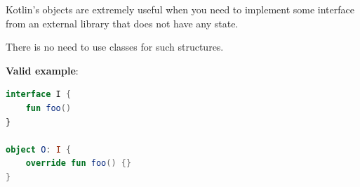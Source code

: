 {{{{Kotlin’s objects are extremely useful when you need to implement some interface from an external library that does not have any state.

There is no need to use classes for such structures.



\textbf{Valid example}:

\begin{lstlisting}[language=Kotlin]
interface I {
    fun foo()
}

object O: I {
    override fun foo() {}
}
\end{lstlisting}






























































































}}}}
